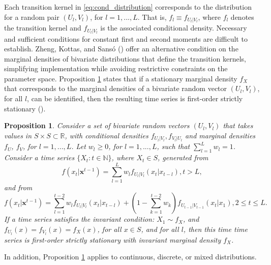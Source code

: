 \documentclass[
  letterpaper,
  double,
  12pt,
  1.0in]{beavtex}
\newtheorem{proposition}{Proposition} %
\begin{document}
Each transition kernel in \ref{eq:cond_distribution} corresponds to the
distribution for a random pair \((U_l, V_l)\), for \(l = 1,..., L\).
That is, \(f_l \equiv f_{U_l | V_l}\), where \(f_l\) denotes the
transition kernel and \(f_{U_l | V_l}\) is the associated conditional
density. Necessary and sufficient conditions for constant first and
second moments are difficult to establish. Zheng, Kottas, and Sansó
() offer an alternative
condition on the marginal densities of bivariate distributions that
define the transition kernels, simplifying implementation while avoiding
restrictive constraints on the parameter space. Proposition
\ref{prop:proposition1} states that if a stationary marginal density
\(f_X\) that corresponds to the marginal densities of a bivariate random
vector \((U_l, V_l)\), for all \(l\), can be identified, then the
resulting time series is first-order strictly stationary
().

\begin{proposition}
\label{prop:proposition1}
Consider a set of bivariate random vectors $(U_l, V_l)$ that takes values in $S \times S \subset \mathbb{R}$, with conditional densities $f_{U_l | V_l}, f_{V_l | U_l}$ and marginal densities $f_U$, $f_V$, for $l = 1,..., L$. Let $w_l \geq 0$, for $l = 1,..., L$, such that $\sum_{l=1}^L w_l = 1$. Consider a time series $\{ X_t: t \in \mathbb{N} \}$, where $X_t \in S$, generated from
\begin{equation}
f(x_t | \textbf{x}^{t-1}) = \sum_{l=1}^L w_l f_{U_l|V_l} (x_t | x_{t-l}), t > L, 
\label{eq:proposition1}
\end{equation}
and from 
\begin{equation} %
f(x_t | \textbf{x}^{t-1}) = \sum_{l=1}^{t-2} w_l f_{U_l|V_l} (x_t | x_{t-l}) + 
\left( 1 - \sum_{k=1}^{t-2} w_k \right) f_{U_{t-1} | V_{t-1}} (x_t|x_1), 2 \leq t \leq L.
\end{equation}   %
If a time series satisfies the invariant condition: $X_1 \sim f_X$, and $f_{U_l}(x) = f_{V_l}(x) = f_X(x)$, for all $x \in S$, and for all $l$, then this time time series is first-order strictly stationary with invariant marginal density $f_X$.
\end{proposition}

In addition, Proposition \ref{prop:proposition1} applies to continuous,
discrete, or mixed distributions.
\end{document}
